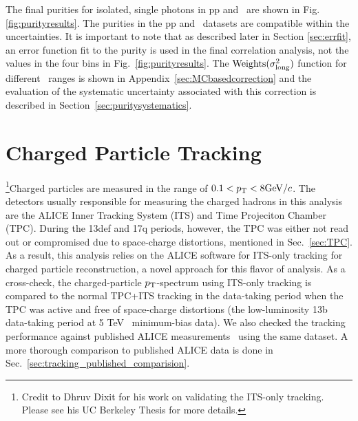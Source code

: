 The final purities for isolated, single photons in pp and \pPb~are shown in Fig. \ref{fig:purityresults}. The purities in the pp and \pPb~datasets are compatible within the uncertainties. It is important to note that as described later in Section \ref{sec:errfit}, an error function fit to the purity is used in the final correlation analysis, not the values in the four bins in Fig.~\ref{fig:purityresults}. The $\text{Weights}(\sigma^{2}_{\mathrm{long}})$ function for different \pt~ranges is shown in Appendix~\ref{sec:MCbasedcorrection} and the evaluation of the systematic uncertainty associated with this correction is described in Section~\ref{sec:puritysystematics}. 
\FloatBarrier



\section{Charged Particle Tracking}
\label{sec:tracking}
\footnote{Credit to Dhruv Dixit for his work on validating the ITS-only tracking. Please see his UC Berkeley Thesis for more details.}Charged particles are measured in the range of $0.1 < p_{\mathrm{T}} < 8 \mathrm{GeV}/c$. The detectors usually responsible for measuring the charged hadrons in this analysis are the ALICE Inner Tracking System (ITS) and Time Projeciton Chamber (TPC). During the 13def and 17q periods, however, the TPC was either not read out or compromised due to space-charge distortions, mentioned in Sec.~\ref{sec:TPC}. As a result, this analysis relies on the ALICE software for ITS-only tracking for charged particle reconstruction, a novel approach for this flavor of analysis. As a cross-check, the charged-particle $p_{\mathrm{T}}$-spectrum using ITS-only tracking is compared to the normal TPC+ITS tracking in the data-taking period when the TPC was active and free of space-charge distortions (the low-luminosity 13b data-taking period at 5 TeV \pPb~minimum-bias data). We also checked the tracking performance against published ALICE measurements~\cite{Acharya:2018qsh} using the same dataset. A more thorough comparison to published ALICE data is done in Sec.~\ref{sec:tracking_published_comparision}.

